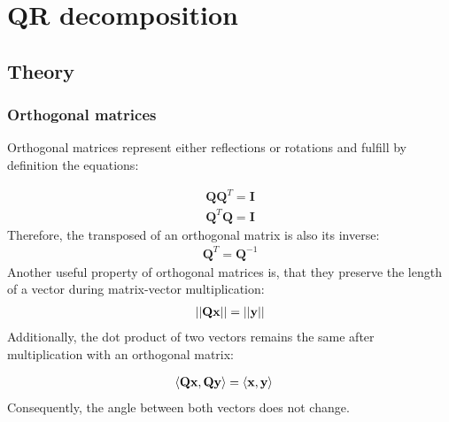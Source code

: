 \newpage
\section{QR decomposition}
\label{sec:QR}



\subsection{Theory}




\subsubsection{Orthogonal matrices}
\label{sec:orthogonalMatrices}

Orthogonal matrices represent either reflections or rotations and fulfill by definition the equations:

\begin{align}
\label{eq:definitionOrthogonal0}
\mathbf{Q}\mathbf{Q}^T = \mathbf{I}\\
\label{eq:definitionOrthogonal1}
\mathbf{Q}^T\mathbf{Q} = \mathbf{I}
\end{align}
%
Therefore, the transposed of an orthogonal matrix is also its inverse:
\begin{align}
\label{eq:orthogonalInverse}
\mathbf{Q}^T = \mathbf{Q}^{-1}
\end{align}
%
Another useful property of orthogonal matrices is, that they preserve the length of a vector during matrix-vector multiplication:
\begin{align}
\label{eq:orthogonalPreserveLength}
\left\vert\left\vert\mathbf{Qx}\right\vert\right\vert= \left\vert\left\vert\mathbf{y}\right\vert\right\vert
\end{align}
%
Additionally, the dot product of two vectors remains the same after multiplication with an orthogonal matrix:

\begin{align}
\langle \mathbf{Q}\mathbf{x},\mathbf{Q}\mathbf{y} \rangle &= \langle \mathbf{x},\mathbf{y} \rangle
\end{align}
%
Consequently, the angle between both vectors does not change.



